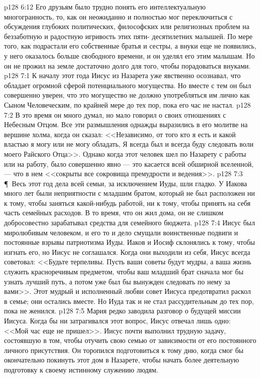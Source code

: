 \vs p128 6:12 Его друзьям было трудно понять его интеллектуальную многогранность, то, как он неожиданно и полностью мог переключиться с обсуждения глубоких политических, философских или религиозных проблем на беззаботную и радостную игривость этих пяти\hyp{} десятилетних малышей. По мере того, как подрастали его собственные братья и сестры, а внуки еще не появились, у него оказалось больше свободного времени, и он уделял его этим малышам. Но он не прожил на земле достаточно долго для того, чтобы порадоваться внуками.
\vs p128 7:1 К началу этот года Иисус из Назарета уже явственно осознавал, что обладает огромной сферой потенциального могущества. Но вместе с тем он был совершенно уверен, что это могущество не должно употребляться им лично как Сыном Человеческим, по крайней мере до тех пор, пока его час не настал.
\vs p128 7:2 В это время он много думал, но мало говорил о своих отношениях с Небесным Отцом. Все эти размышления однажды выразились в его молитве на вершине холма, когда он сказал: <<Независимо, от того кто я есть и какой властью я могу или не могу обладать, Я всегда был и всегда буду следовать воли моего Райского Отца>>. Однако когда этот человек шел по Назарету с работы или на работу, было совершенно явно --- это касается всей обширной вселенной, --- что в нем <<сокрыты все сокровища премудрости и ведения>>.
\vs p128 7:3 \P\ Весь этот год дела всей семьи, за исключением Иуды, шли гладко. У Иакова много лет были неприятности с младшим братом, который не был расположен ни к тому, чтобы заняться какой\hyp{}нибудь работой, ни к тому, чтобы принять на себя часть семейных расходов. В то время, что он жил дома, он не слишком добросовестно зарабатывал средства для семейного бюджета.
\vs p128 7:4 Иисус был миролюбивым человеком, и его то и дело смущали воинственные подвиги и постоянные взрывы патриотизма Иуды. Иаков и Иосиф склонялись к тому, чтобы изгнать его, но Иисус не соглашался. Когда они выходили из себя, Иисус всегда советовал: <<Будьте терпеливы. Пусть ваши советы будут мудры, а ваша жизнь служить красноречивым предметом, чтобы ваш младший брат сначала мог бы узнать лучший путь, а потом уже был бы вынужден следовать по нему за вами>>. Этот мудрый и исполненный любви совет Иисуса предотвратил раскол в семье; они остались вместе. Но Иуда так и не стал рассудительным до тех пор, пока не женился.
\vs p128 7:5 Мария редко заводила разговор о будущей миссии Иисуса. Когда бы ни затрагивался этот вопрос, Иисус отвечал лишь одно: <<Мой час еще не пришел>>. Иисус почти выполнил трудную задачу, состоявшую в том, чтобы отучить свою семью от зависимости от его постоянного личного присутствия. Он торопился подготовиться к тому дню, когда смог бы окончательно покинуть этот дом в Назарете, чтобы начать более деятельную подготовку к своему истинному служению людям.
